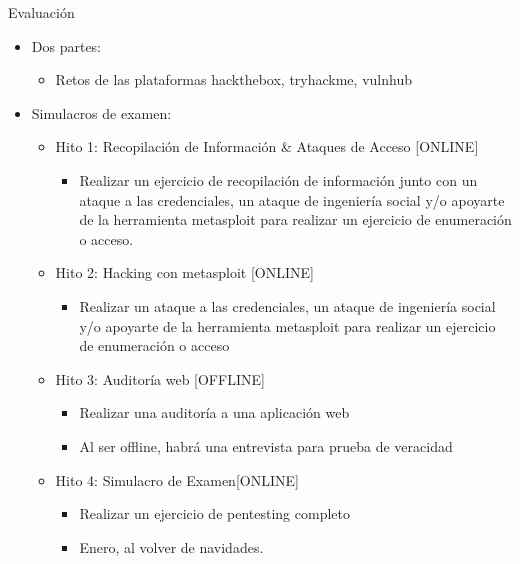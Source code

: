 \documentclass[aspectratio=169,11pt]{beamer}
\begin{document}
\begin{frame}[allowframebreaks]{Evaluación}
\small
\begin{itemize}
  \item Dos partes:
  \begin{itemize}
    \item Retos de las plataformas hackthebox, tryhackme, vulnhub
  \end{itemize}
  \item Simulacros de examen:
  \begin{itemize}
    \item Hito 1: Recopilación de Información \& Ataques de Acceso [ONLINE]
    \begin{itemize}
      \item Realizar un ejercicio de recopilación de información junto con un ataque a las credenciales, un ataque de ingeniería social y/o apoyarte de la herramienta metasploit para realizar un ejercicio de enumeración o acceso. 
    \end{itemize}

    \item Hito 2: Hacking con metasploit [ONLINE]
    \begin{itemize}
      \item Realizar un ataque a las credenciales, un ataque de ingeniería social y/o apoyarte de la herramienta metasploit para realizar un ejercicio de enumeración o acceso
    \end{itemize}
    \item Hito 3: Auditoría web [OFFLINE]
    \begin{itemize}
      \item Realizar una auditoría a una aplicación web
      \item Al ser offline, habrá una entrevista para prueba de veracidad
    \end{itemize}
    \item Hito 4: Simulacro de Examen[ONLINE]
    \begin{itemize}
      \item Realizar un ejercicio de pentesting completo
      \item Enero, al volver de navidades.
    \end{itemize}
  \end{itemize}
\end{itemize}
\end{frame}
\end{document}
